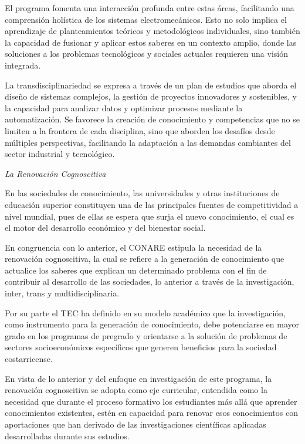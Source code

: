 El programa fomenta una interacción profunda entre estas áreas, facilitando una comprensión holística de los sistemas electromecánicos. Esto no solo implica el aprendizaje de planteamientos teóricos y metodológicos individuales, sino también la capacidad de fusionar y aplicar estos saberes en un contexto amplio, donde las soluciones a los problemas tecnológicos y sociales actuales requieren una visión integrada.\par

La transdisciplinariedad se expresa a través de un plan de estudios que aborda el diseño de sistemas complejos, la gestión de proyectos innovadores y sostenibles, y la capacidad para analizar datos y optimizar procesos mediante la automatización. Se favorece la creación de conocimiento y competencias que no se limiten a la frontera de cada disciplina, sino que aborden los desafíos desde múltiples perspectivas, facilitando la adaptación a las demandas cambiantes del sector industrial y tecnológico.\par

\textit{La Renovación Cognoscitiva}\par

En las sociedades de conocimiento, las universidades y otras instituciones de educación superior constituyen una de las principales fuentes de competitividad a nivel mundial, pues de ellas se espera que surja el nuevo conocimiento, el cual es el motor del desarrollo económico y del bienestar social.\par

En congruencia con lo anterior, el CONARE  estipula la necesidad de la renovación cognoscitiva, la cual se refiere a la generación de conocimiento que actualice los saberes que explican un determinado problema con el fin de contribuir al desarrollo de las sociedades, lo anterior a través de la investigación, inter, trans y multidisciplinaria.\par

Por su parte el TEC ha definido en su modelo académico que la investigación, como instrumento para la generación de conocimiento, debe potenciarse en mayor grado en los programas de pregrado y orientarse a la solución de problemas de sectores socioeconómicos específicos que generen beneficios para la sociedad costarricense.\par

En vista de lo anterior y del enfoque en investigación de este programa, la renovación cognoscitiva se adopta como eje curricular, entendida como la necesidad que durante el proceso formativo los estudiantes más allá que aprender conocimientos existentes, estén en capacidad para renovar esos conocimientos con aportaciones que han derivado de las investigaciones científicas aplicadas desarrolladas durante sus estudios.\par

